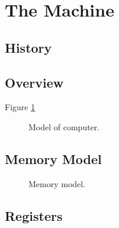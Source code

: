 \section{The Machine}
\label{sec:machine}

\subsection{History}







\subsection{Overview}

Figure \ref{fig:machine:computer}

\begin{figure}[tbp]
  
  \caption{Model of computer.}
  \label{fig:machine:computer}
\end{figure}

\subsection{Memory Model}

\begin{figure}[tbp]
  
  \caption{Memory model.}
  \label{fig:machine:memory}
\end{figure}

\subsection{Registers}



